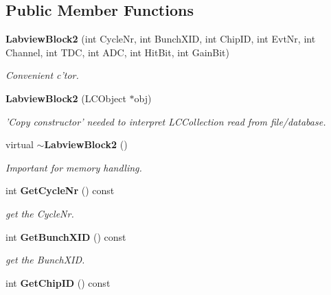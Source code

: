 \subsection*{Public Member Functions}
\begin{DoxyCompactItemize}
\item 
{\bf Labview\-Block2} (int Cycle\-Nr, int Bunch\-X\-I\-D, int Chip\-I\-D, int Evt\-Nr, int Channel, int T\-D\-C, int A\-D\-C, int Hit\-Bit, int Gain\-Bit)\label{classCALICE_1_1LabviewBlock2_aa409f51a0803d4ca5e6fe15204262118}

\begin{DoxyCompactList}\small\item\em Convenient c'tor. \end{DoxyCompactList}\item 
{\bf Labview\-Block2} (L\-C\-Object $\ast$obj)\label{classCALICE_1_1LabviewBlock2_acb5c7d7d0a0d9aecff3434f8b712745d}

\begin{DoxyCompactList}\small\item\em 'Copy constructor' needed to interpret L\-C\-Collection read from file/database. \end{DoxyCompactList}\item 
virtual {\bf $\sim$\-Labview\-Block2} ()\label{classCALICE_1_1LabviewBlock2_aabc7bc093f568a532a4cf7097a84fb99}

\begin{DoxyCompactList}\small\item\em Important for memory handling. \end{DoxyCompactList}\item 
int {\bf Get\-Cycle\-Nr} () const \label{classCALICE_1_1LabviewBlock2_aabd11e4b300c4a3644ff5fbbf513af36}

\begin{DoxyCompactList}\small\item\em get the Cycle\-Nr. \end{DoxyCompactList}\item 
int {\bf Get\-Bunch\-X\-I\-D} () const \label{classCALICE_1_1LabviewBlock2_ae25025f2f9bc95883c2d6b23d38ecc8e}

\begin{DoxyCompactList}\small\item\em get the Bunch\-X\-I\-D. \end{DoxyCompactList}\item 
int {\bf Get\-Chip\-I\-D} () const \label{classCALICE_1_1LabviewBlock2_a6e1e7613bbf370e6a0e11ef3896bb6f9}


\end{DoxyCompactItemize}
